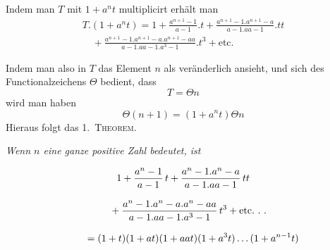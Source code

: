 Indem man $T$ mit $1+a^n t$ multiplicirt erhält man
\[
\begin{gathered}T.(1+a^n t)=1+\frac{a^{n+1}-1}{a-1}.t
+\frac{a^{n+1}-1.a^{n+1}-a}{a-1.aa-1}.tt
\\[8pt]\quad{}+\frac{a^{n+1}-1.a^{n+1}-a.a^{n+1}-aa}{a-1.aa-1.a^3-1}.t^3
+\text{etc.}\end{gathered}
\]

Indem man also in $T$ das Element $n$ als veränderlich ansieht, und sich
des Functionalzeichens $\Theta$ bedient, dass
\[
T=\Theta n
\]
wird man haben
\[
\Theta(n+1)=(1+a^n t)\Theta n
\]
Hieraus folgt das 1.\ \textsc{Theorem.}



\begin{center}
\textit{Wenn $n$ eine ganze positive Zahl bedeutet, ist}
\end{center}
\[
\begin{gathered}
1+\frac{a^n-1}{a-1}\,t
 +\frac{a^n-1.a^n-a}{a-1.aa-1}\,tt
 \\[8pt]\quad{}+\frac{a^n-1.a^n-a.a^n-aa}{a-1.aa-1.a^3-1}\,t^3
 +\text{etc.}\ .\ .
\\[8pt]
\qquad=(1+t)(1+at)(1+aat)(1+a^3t)\mathinner{.\,.\,.}(1+a^{n-1}t)
\end{gathered}
\]

